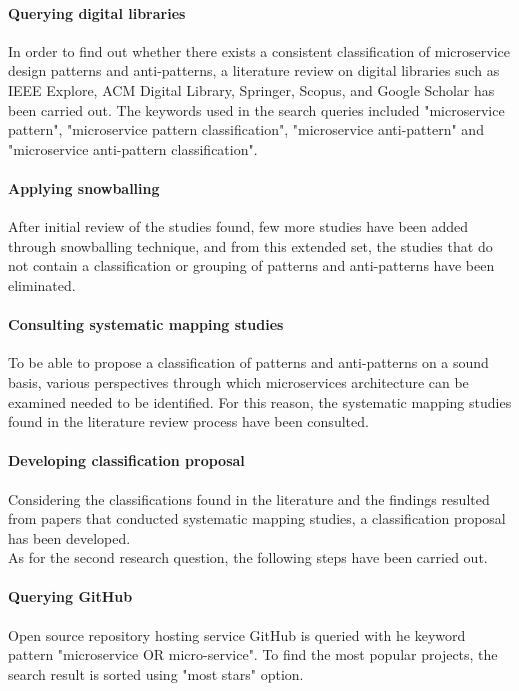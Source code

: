 \documentclass[11pt,a4paper,twocolumn]{article}
\begin{document}
\paragraph{Querying digital libraries}
In order to find out whether there exists a consistent classification of microservice design patterns and anti-patterns, a literature review on digital libraries such as IEEE Explore, ACM Digital Library, Springer, Scopus, and Google Scholar has been carried out.
The keywords used in the search queries included "microservice pattern", "microservice pattern classification", "microservice anti-pattern" and "microservice anti-pattern classification".

\paragraph{Applying snowballing}
After initial review of the studies found, few more studies have been added through snowballing technique, and from this extended set, the studies that do not contain a classification or grouping of patterns and anti-patterns have been eliminated.

\paragraph{Consulting systematic mapping studies}
To be able to propose a classification of patterns and anti-patterns on a sound basis, various perspectives through which microservices architecture can be examined needed to be identified.
For this reason, the systematic mapping studies found in the literature review process have been consulted.

\paragraph{Developing classification proposal}
Considering the classifications found in the literature and the findings resulted from papers that conducted systematic mapping studies, a classification proposal has been developed.\\

As for the second research question, the following steps have been carried out.

\paragraph{Querying GitHub}
Open source repository hosting service GitHub is queried with he keyword pattern "microservice OR micro-service". 
To find the most popular projects, the search result is sorted using "most stars" option.
\end{document}
